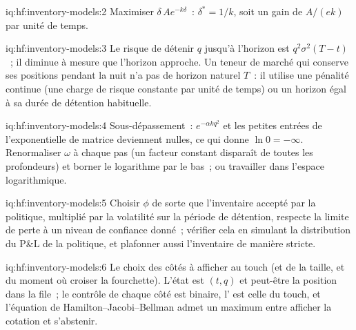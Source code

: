 \begin{solution}{iq:hf:inventory-models:2}
Maximiser $\delta\,Ae^{-k\delta}$~: $\delta^\ast=1/k$, soit un gain de $A/(ek)$ par unité de temps.
\end{solution}

\begin{solution}{iq:hf:inventory-models:3}
Le risque de détenir $q$ jusqu'à l'horizon est $q^2\sigma^2(T-t)$~; il diminue à mesure que l'horizon approche. Un teneur de marché qui conserve ses positions pendant la nuit n'a pas de
horizon naturel $T$~: il utilise une pénalité continue (une charge de risque constante par unité de temps) ou un horizon égal à sa durée de détention habituelle.
\end{solution}

\begin{solution}{iq:hf:inventory-models:4}
Sous-dépassement~: $e^{-\alpha kq^2}$ et les petites entrées de l'exponentielle de matrice deviennent nulles, ce qui donne $\ln0=-\infty$. Renormaliser $\omega$ à chaque pas (un
facteur constant disparaît de toutes les profondeurs) et borner le logarithme par le bas~; ou travailler dans l'espace logarithmique.
\end{solution}

\begin{solution}{iq:hf:inventory-models:5}
Choisir $\phi$ de sorte que l'inventaire accepté par la politique, multiplié par la volatilité sur la période de détention, respecte la limite de perte à un niveau de confiance donné~; vérifier
cela en simulant la distribution du P\&L de la politique, et plafonner aussi l'inventaire de manière stricte.
\end{solution}

\begin{solution}{iq:hf:inventory-models:6}
Le choix des côtés à afficher au touch (et de la taille, et du moment où croiser la fourchette). L'état est $(t,q)$ et peut-être la position dans la file~; le contrôle de chaque
côté est binaire, l' est celle du touch, et l'équation de Hamilton--Jacobi--Bellman admet un maximum entre afficher la cotation et s'abstenir.
\end{solution}

